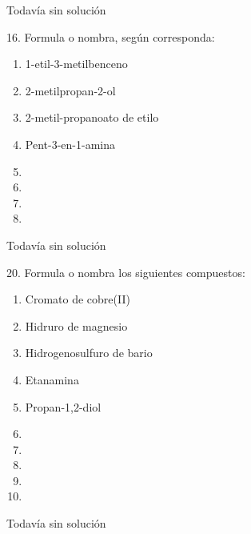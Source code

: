 \documentclass{article}
\begin{document}
\begin{solution}[print=false]
  Todavía sin solución
\end{solution}

\begin{exercise}
  16. Formula o nombra, según corresponda:
  \begin{enumerate}
    \item 1-etil-3-metilbenceno
    \item 2-metilpropan-2-ol
    \item 2-metil-propanoato de etilo
    \item Pent-3-en-1-amina
    \item {}
    \item {}
    \item {}
    \item {}
  \end{enumerate}
\end{exercise}

\begin{solution}[print=false]
  Todavía sin solución
\end{solution}

\begin{exercise}
  20. Formula o nombra los siguientes compuestos:
  \begin{enumerate}
    \item Cromato de cobre(II)
    \item Hidruro de magnesio
    \item Hidrogenosulfuro de bario
    \item Etanamina
    \item Propan-1,2-diol
    \item {}
    \item {}
    \item {}
    \item {} %
    \item {}
  \end{enumerate}
\end{exercise}

\begin{solution}[print=false]
  Todavía sin solución
\end{solution}
\end{document}
